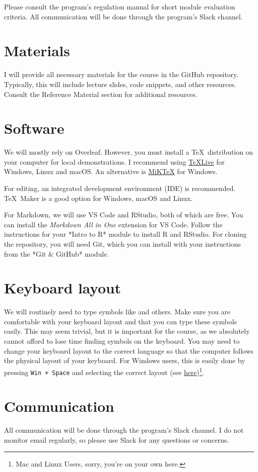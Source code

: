 \documentclass[a4paper,11pt]{article}
\begin{document}
Please consult the program's regulation manual for short module evaluation criteria. All communication will be done through the program's Slack channel. 

\section{Materials}

I will provide all necessary materials for the course in the GitHub repository. Typically, this will include lecture slides, code snippets, and other resources. Consult the Reference Material section for additional resources. 

\section{Software}

We will mostly rely on Overleaf. However, you must install a \TeX \ distribution on your computer for local demonstrations. I recommend using \href{https://www.tug.org/texlive/}{\TeX Live} for Windows, Linux and macOS. An alternative is \href{https://miktex.org/}{MiK\TeX} for Windows.

For editing, an integrated development environment (IDE) is recommended. \TeX \ Maker is a good option for Windows, macOS and Linux.

For Markdown, we will use VS Code and RStudio, both of which are free. You can install the \textit{Markdown All in One} extension for VS Code. Follow the instructions for your *Intro to R* module to install R and RStudio. For cloning the repository, you will need Git, which you can install with your instructions from the *Git \& GitHub* module.

\section{Keyboard layout}

We will routinely need to type symbols like and others. Make sure you are comfortable with your keyboard layout and that you can type these symbols easily. This may seem trivial, but it is important for the course, as we absolutely cannot afford to lose time finding symbols on the keyboard. You may need to change your keyboard layout to the correct language so that the computer follows the physical layout of your keyboard. For Windows users, this is easily done by pressing \texttt{Win + Space} and selecting the correct layout (see \href{https://support.microsoft.com/en-us/windows/change-your-keyboard-layout-245c49b8-f856-7fd7-2cf5-41e54c66f5b3}{here})\footnote{Mac and Linux Users, sorry, you're on your own here.}.

\section{Communication}

All communication will be done through the program's Slack channel. I do not monitor email regularly, so please use Slack for any questions or concerns.

\renewcommand\bibname{Reference Material}
\printbibliography
\end{document}
